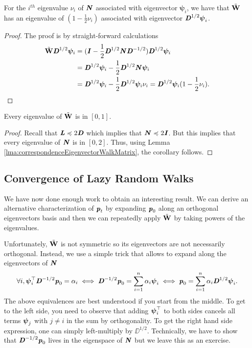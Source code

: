 \begin{lemma}\label{lma:correspondenceEigenvectorWalkMatrix}
For the $i^{th}$ eigenvalue $\nu_i$ of $\boldsymbol{\mathit{N}}$ associated with eigenvector $\bm{\psi}_i$, we have that ${\tilde{\mathbf{W}}}$ has an eigenvalue of $(1 - \frac{1}{2}\nu_i)$ associated with eigenvector $\boldsymbol{\mathit{D}}^{1/2} \boldsymbol{\mathit{\psi}}_i$.
\end{lemma}
\begin{proof}
The proof is by straight-forward calculations
\begin{align*}
    {\tilde{\mathbf{W}}} \boldsymbol{\mathit{D}}^{1/2} \bm{\psi}_i &= (\boldsymbol{\mathit{I}} - \frac{1}{2} \boldsymbol{\mathit{D}}^{1/2}\boldsymbol{\mathit{N}} \boldsymbol{\mathit{D}}^{-1/2})\boldsymbol{\mathit{D}}^{1/2} \bm{\psi}_i \\ &= \boldsymbol{\mathit{D}}^{1/2} \bm{\psi}_i - \frac{1}{2} \boldsymbol{\mathit{D}}^{1/2}\boldsymbol{\mathit{N}} \bm{\psi}_i \\
    &=\boldsymbol{\mathit{D}}^{1/2} \bm{\psi}_i - \frac{1}{2} \boldsymbol{\mathit{D}}^{1/2}\bm{\psi}_i \nu_i = \boldsymbol{\mathit{D}}^{1/2} \bm{\psi}_i (1 - \frac{1}{2}\nu_i).
\end{align*}
\end{proof}

\begin{corollary}
Every eigenvalue of ${\tilde{\mathbf{W}}}$ is in $[0,1]$.
\end{corollary}
\begin{proof}
Recall that $\boldsymbol{\mathit{L}} \preccurlyeq 2\boldsymbol{\mathit{D}}$ which implies that $\boldsymbol{\mathit{N}} \preccurlyeq 2 \boldsymbol{\mathit{I}}$. But this implies that every eigenvalue of $\boldsymbol{\mathit{N}}$ is in $[0,2]$. Thus, using Lemma \ref{lma:correspondenceEigenvectorWalkMatrix}, the corollary follows.
\end{proof}

\subsection{Convergence of Lazy Random Walks}

We have now done enough work to obtain an interesting result. We can derive an alternative characterization of $\boldsymbol{\mathit{p}}_t$ by expanding $\boldsymbol{\mathit{p}}_0$ along an orthogonal eigenvectors basis and then we can repeatedly apply ${\tilde{\mathbf{W}}}$ by taking powers of the eigenvalues. 

Unfortunately, ${\tilde{\mathbf{W}}}$ is not symmetric so its eigenvectors are not necessarily orthogonal. Instead, we use a simple trick that allows to expand along the eigenvectors of $\boldsymbol{\mathit{N}}$
\begin{align}\label{eq:definitionOfAlphaForWalks}
     \forall i, \boldsymbol{\mathit{\psi}}_i^{\top} \boldsymbol{\mathit{D}}^{-1/2} \boldsymbol{\mathit{p}}_0 = \alpha_i \iff \boldsymbol{\mathit{D}}^{-1/2} \boldsymbol{\mathit{p}}_0 = \sum_{i=1}^n \alpha_i \boldsymbol{\mathit{\psi}}_i \iff  \boldsymbol{\mathit{p}}_0 = \sum_{i=1}^n \alpha_i \boldsymbol{\mathit{D}}^{1/2} \boldsymbol{\mathit{\psi}}_i.
\end{align}
The above equivalences are best understood if you start from the middle. To get to the left side, you need to observe that adding $\boldsymbol{\mathit{\psi}}_i^{\top}$ to both sides cancels all terms $\boldsymbol{\mathit{\psi}}_j$ with $j \neq i$ in the sum by orthogonality. To get the right hand side expression, one can simply left-multiply by $\DD^{1/2}$. Technically, we have to show that $\boldsymbol{\mathit{D}}^{-1/2}\boldsymbol{\mathit{p}}_0$ lives in the eigenspace of $\boldsymbol{\mathit{N}}$ but we leave this as an exercise.

